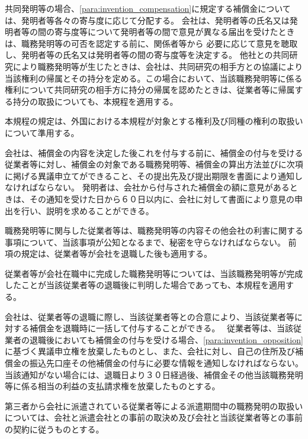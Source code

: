 \documentclass[10pt,a4paper,uplatex]{jsarticle}
\begin{document}
共同発明等の場合、\ref{para:invention_compensation}に規定する補償金については、発明者等各々の寄与度に応じて分配する。
\label{para:invention_collaboration}
\term 会社は、発明者等の氏名又は発明者等の間の寄与度等について発明者等の間で意見が異なる届出を受けたときは、職務発明等の可否を認定する前に、関係者等から 必要に応じて意見を聴取し、発明者等の氏名又は発明者等の間の寄与度等を決定する。
\term 他社との共同研究により職務発明等が生じたときは、会社は、共同研究の相手方との協議により当該権利の帰属とその持分を定める。この場合において、当該職務発明等に係る権利について共同研究の相手方に持分の帰属を認めたときは、従業者等に帰属する持分の取扱についても、本規程を適用する。

本規程の規定は、外国における本規程が対象とする権利及び同種の権利の取扱いについて準用する。

会社は、補償金の内容を決定した後これを付与する前に、補償金の付与を受ける従業者等に対し、補償金の対象である職務発明等、補償金の算出方法並びに次項に掲げる異議申立てができること、その提出先及び提出期限を書面により通知しなければならない。
\label{para:invention_opposition}
\term 発明者は、会社から付与された補償金の額に意見があるときは、その通知を受けた日から６０日以内に、会社に対して書面により意見の申出を行い、説明を求めることができる。

職務発明等に関与した従業者等は、職務発明等の内容その他会社の利害に関する事項について、当該事項が公知となるまで、秘密を守らなければならない。
\term 前項の規定は、従業者等が会社を退職した後も適用する。

従業者等が会社在職中に完成した職務発明等については、当該職務発明等が完成したことが当該従業者等の退職後に判明した場合であっても、本規程を適用する。

会社は、従業者等の退職に際し、当該従業者等との合意により、当該従業者等に対する補償金を退職時に一括して付与することができる。　
\label{para:invention_retiree}
\term 従業者等は、当該従業者の退職後においても補償金の付与を受ける場合、\ref{para:invention_opposition}に基づく異議申立権を放棄したものとし、また、会社に対し、自己の住所及び補償金の振込先口座その他補償金の付与に必要な情報を通知しなければならない。当該通知がない場合には、退職日より３０日経過後、補償金その他当該職務発明等に係る相当の利益の支払請求権を放棄したものとする。

第三者から会社に派遣されている従業者等による派遣期間中の職務発明の取扱いについては、会社と派遣会社との事前の取決め及び会社と当該従業者等との事前の契約に従うものとする。
\end{document}
